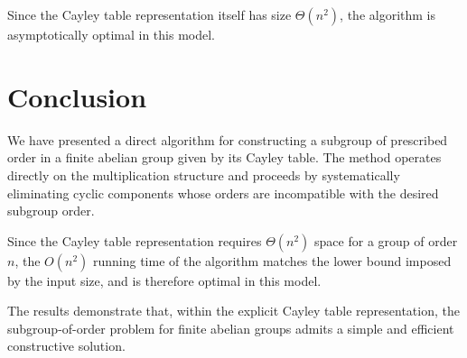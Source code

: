 \documentclass[11pt]{article}
\begin{document}
	Since the Cayley table representation itself has size $\Theta(n^2)$, the algorithm is asymptotically optimal in this model.
	
	\section{Conclusion}
	
	We have presented a direct algorithm for constructing a subgroup
	of prescribed order in a finite abelian group given by its Cayley table.
	The method operates directly on the multiplication structure
	and proceeds by systematically eliminating cyclic components
	whose orders are incompatible with the desired subgroup order.
	
	Since the Cayley table representation requires $\Theta(n^2)$ space
	for a group of order $n$,
	the $O(n^2)$ running time of the algorithm
	matches the lower bound imposed by the input size,
	and is therefore optimal in this model.
	
	The results demonstrate that,
	within the explicit Cayley table representation,
	the subgroup-of-order problem for finite abelian groups
	admits a simple and efficient constructive solution.
	
	
	
	
	
	
	
	
	
	
	
\end{document}
